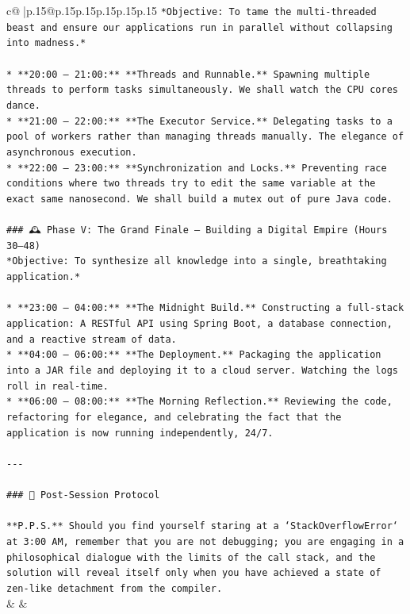 \documentclass{article}
\begin{document}
{\begin{supertabular}{c@{$\;$}|p{.15\linewidth}@{}p{.15\linewidth}p{.15\linewidth}p{.15\linewidth}p{.15\linewidth}p{.15\linewidth}}
{{{\texttt{*Objective: To tame the multi{-}threaded beast and ensure our applications run in parallel without collapsing into madness.*} \\
\\ 
\texttt{*   **20:00 – 21:00:** **Threads and Runnable.** Spawning multiple threads to perform tasks simultaneously. We shall watch the CPU cores dance.} \\
\texttt{*   **21:00 – 22:00:** **The Executor Service.** Delegating tasks to a pool of workers rather than managing threads manually. The elegance of asynchronous execution.} \\
\texttt{*   **22:00 – 23:00:** **Synchronization and Locks.** Preventing race conditions where two threads try to edit the same variable at the exact same nanosecond. We shall build a mutex out of pure Java code.} \\
\\ 
\texttt{\#\#\# 🕰️ Phase V: The Grand Finale – Building a Digital Empire (Hours 30–48)} \\
\texttt{*Objective: To synthesize all knowledge into a single, breathtaking application.*} \\
\\ 
\texttt{*   **23:00 – 04:00:** **The Midnight Build.** Constructing a full{-}stack application: A RESTful API using Spring Boot, a database connection, and a reactive stream of data.} \\
\texttt{*   **04:00 – 06:00:** **The Deployment.** Packaging the application into a JAR file and deploying it to a cloud server. Watching the logs roll in real{-}time.} \\
\texttt{*   **06:00 – 08:00:** **The Morning Reflection.** Reviewing the code, refactoring for elegance, and celebrating the fact that the application is now running independently, 24/7.} \\
\\ 
\texttt{{-}{-}{-}} \\
\\ 
\texttt{\#\#\# 📜 Post{-}Session Protocol} \\
\\ 
\texttt{**P.P.S.** Should you find yourself staring at a `StackOverflowError` at 3:00 AM, remember that you are not debugging; you are engaging in a philosophical dialogue with the limits of the call stack, and the solution will reveal itself only when you have achieved a state of zen{-}like detachment from the compiler.} \\
            }
        }
    }
    & & \\ \\


\end{supertabular}}
\end{document}
